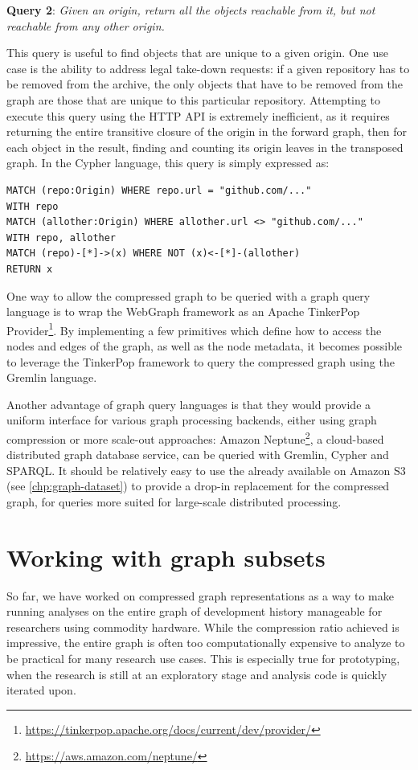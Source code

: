 \textbf{Query 2}: \emph{Given an origin, return all the objects reachable from
it, but not reachable from any other origin.}

This query is useful to find objects that are unique to a given origin. One
use case is the ability to address legal take-down requests: if a given
repository has to be removed from the archive, the only objects that have to be
removed from the graph are those that are unique to this particular repository.
Attempting to execute this query using the HTTP API is extremely inefficient,
as it requires returning the entire transitive closure of the origin in the
forward graph, then for each object in the result, finding and counting its
origin leaves in the transposed graph. In the Cypher language, this query is
simply expressed as:

\begin{verbatim}
MATCH (repo:Origin) WHERE repo.url = "github.com/..."
WITH repo
MATCH (allother:Origin) WHERE allother.url <> "github.com/..."
WITH repo, allother
MATCH (repo)-[*]->(x) WHERE NOT (x)<-[*]-(allother)
RETURN x
\end{verbatim}

One way to allow the compressed graph to be queried with a graph query language
is to wrap the WebGraph framework as an Apache TinkerPop
Provider\footnote{\url{https://tinkerpop.apache.org/docs/current/dev/provider/}}.
By implementing a few primitives which define how to access the nodes and edges
of the graph, as well as the node metadata, it becomes possible to leverage the
TinkerPop framework to query the compressed graph using the Gremlin language.

Another advantage of graph query languages is that they would provide a uniform
interface for various graph processing backends, either using graph compression
or more scale-out approaches: Amazon
Neptune\footnote{\url{https://aws.amazon.com/neptune/}}, a cloud-based
distributed graph database service, can be queried with Gremlin, Cypher and
SPARQL\@. It should be relatively easy to use the \SWHGD{} already available on
Amazon S3 (see \cref{chp:graph-dataset}) to provide a drop-in replacement for
the compressed graph, for queries more suited for large-scale distributed
processing.


\section{Working with graph subsets}%
\label{sec:subdatasets}

So far, we have worked on compressed graph representations as a way to make
running analyses on the entire graph of development history manageable for
researchers using commodity hardware. While the compression ratio achieved is
impressive, the entire graph is often too computationally expensive to analyze
to be practical for many research use cases.  This is especially true for
prototyping, when the research is still at an exploratory stage and analysis
code is quickly iterated upon.

